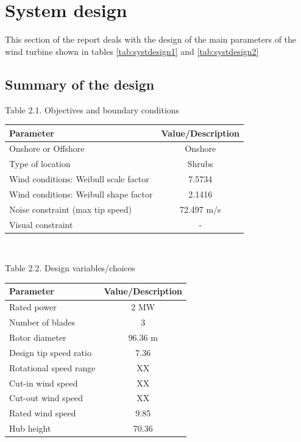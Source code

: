 \section{System design}
This section of the report deals with the design of the main parameters of the wind turbine shown in tables \ref{tab:systdesign1} and \ref{tab:systdesign2}
\subsection{Summary of the design}


\begin{center} 
Table 2.1. Objectives and boundary conditions\\
\begin{tabular}{ |l|c| } \label{tab:systdesign1}
\hline
\textbf{Parameter} & \textbf{Value/Description}  \\ 
\hline
Onshore or Offshore & Onshore  \\ 
\hline
Type of location & Shrubs \\ 
\hline
Wind conditions: Weibull scale factor & 7.5734 \\
\hline
Wind conditions: Weibull shape factor & 2.1416 \\
\hline
Noise constraint (max tip speed) & 72.497 m/s \\
\hline
Visual constraint & - \\
\hline
\end{tabular} \\
\end{center}

\begin{center} 
Table 2.2. Design variables/choices\\
\begin{tabular}{ |l|c| } \label{tab:systdesign2}
\hline
\textbf{Parameter} & \textbf{Value/Description}  \\ 
\hline
Rated power & 2 MW  \\ 
\hline
Number of blades & 3 \\ 
\hline
Rotor diameter & 96.36 m \\
\hline
Design tip speed ratio & 7.36 \\
\hline
Rotational speed range & XX \\
\hline
Cut-in wind speed & XX \\
\hline
Cut-out wind speed & XX \\
\hline
Rated wind speed & 9.85 \\
\hline
Hub height & 70.36 \\
\hline
\end{tabular}
\end{center}

